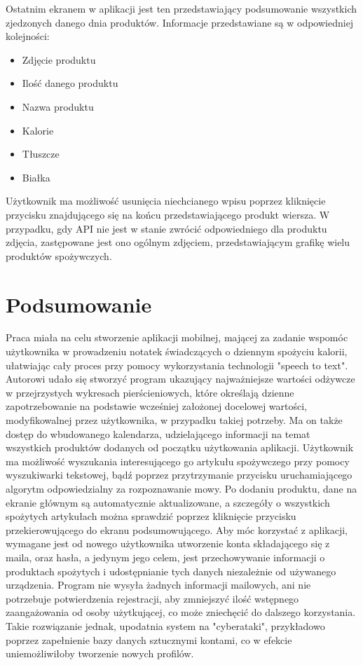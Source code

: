 \documentclass[12pt, a4paper]{article}
\begin{document}
\begin{sloppypar}
{{    Ostatnim ekranem w aplikacji jest ten przedstawiający podsumowanie wszystkich zjedzonych
    danego dnia produktów. Informacje przedstawiane są w odpowiedniej kolejności:
    \begin{itemize}
      \item Zdjęcie produktu
      \item Ilość danego produktu
      \item Nazwa produktu
      \item Kalorie
      \item Tłuszcze
      \item Białka
    \end{itemize}
    Użytkownik ma możliwość usunięcia niechcianego wpisu poprzez kliknięcie przycisku
    znajdującego się na końcu przedstawiającego produkt wiersza. W przypadku, gdy API nie
    jest w stanie zwrócić odpowiedniego dla produktu zdjęcia, zastępowane jest ono ogólnym
    zdjęciem, przedstawiającym grafikę wielu produktów spożywczych.
  }
}

\section{Podsumowanie}
{
  Praca miała na celu stworzenie aplikacji mobilnej, mającej za zadanie wspomóc użytkownika
  w prowadzeniu notatek świadczących o dziennym spożyciu kalorii, ułatwiając cały proces
  przy pomocy wykorzystania technologii "speech to text". Autorowi udało się stworzyć program
  ukazujący najważniejsze wartości odżywcze w przejrzystych wykresach pierścieniowych, które
  określają dzienne zapotrzebowanie na podstawie wcześniej założonej docelowej wartości,
  modyfikowalnej przez użytkownika, w przypadku takiej potrzeby. Ma on także dostęp do
  wbudowanego kalendarza, udzielającego informacji na temat wszystkich produktów dodanych od
  początku użytkowania aplikacji. Użytkownik ma możliwość wyszukania interesującego go
  artykułu spożywczego przy pomocy wyszukiwarki tekstowej, bądź poprzez przytrzymanie przycisku
  uruchamiającego algorytm odpowiedzialny za rozpoznawanie mowy. Po dodaniu produktu, dane na
  ekranie głównym są automatycznie aktualizowane, a szczegóły o wszystkich spożytych artykułach
  można sprawdzić poprzez kliknięcie przycisku przekierowującego do ekranu podsumowującego. 
  Aby móc korzystać z aplikacji, wymagane jest od nowego użytkownika utworzenie
  konta składającego się z maila, oraz hasła, a jedynym jego celem, jest przechowywanie informacji
  o produktach spożytych i udostępnianie tych danych niezależnie od używanego urządzenia.
  Program nie wysyła żadnych informacji mailowych, ani nie potrzebuje potwierdzenia rejestracji,
  aby zmniejszyć ilość wstępnego zaangażowania od osoby użytkującej, co może zniechęcić do
  dalszego korzystania. Takie rozwiązanie jednak, upodatnia system na "cyberataki", przykładowo
  poprzez zapełnienie bazy danych sztucznymi kontami, co w efekcie uniemożliwiłoby tworzenie
  nowych profilów.

}
\end{sloppypar}
\end{document}
